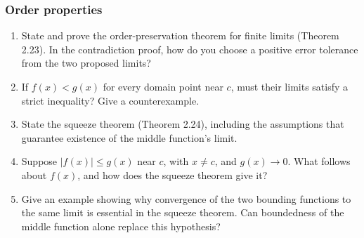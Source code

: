 \subsubsection*{Order properties}
\begin{enumerate}[resume]
  \item State and prove the order-preservation theorem for finite
    limits (Theorem 2.23). In the contradiction proof, how do you
    choose a positive error tolerance from the two proposed limits?

  \item If \(f(x)<g(x)\) for every domain point near \(c\), must
    their limits satisfy a strict inequality? Give a counterexample.

  \item State the squeeze theorem (Theorem 2.24), including the
    assumptions that guarantee existence of the middle function's limit.

  \item Suppose \(|f(x)|\leq g(x)\) near \(c\), with \(x\ne c\),
    and \(g(x)\to0\). What follows about \(f(x)\), and how does
    the squeeze theorem give it?

  \item Give an example showing why convergence of the two bounding
    functions to the same limit is essential in the squeeze theorem.
    Can boundedness of the middle function alone replace this hypothesis?
\end{enumerate}
